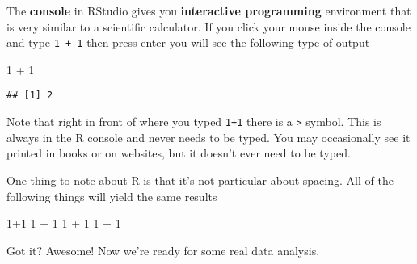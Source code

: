 \documentclass[
]{book}
\newenvironment{Shaded}{\begin{snugshade}}{\end{snugshade}}
\newcommand{\DecValTok}[1]{\textcolor[rgb]{0.00,0.00,0.81}{#1}}
\newcommand{\SpecialCharTok}[1]{\textcolor[rgb]{0.00,0.00,0.00}{#1}}
\begin{document}
The \textbf{console} in RStudio gives you \textbf{interactive programming} environment that is very similar to a scientific calculator. If you click your mouse inside the console and type \texttt{1\ +\ 1} then press enter you will see the following type of output

\begin{Shaded}
\begin{Highlighting}[]
\DecValTok{1} \SpecialCharTok{+} \DecValTok{1}
\end{Highlighting}
\end{Shaded}

\begin{verbatim}
## [1] 2
\end{verbatim}

Note that right in front of where you typed \texttt{1+1} there is a \texttt{\textgreater{}} symbol. This is always in the R console and never needs to be typed. You may occasionally see it printed in books or on websites, but it doesn't ever need to be typed.

One thing to note about R is that it's not particular about spacing. All of the following things will yield the same results

\begin{Shaded}
\begin{Highlighting}[]
\DecValTok{1}\SpecialCharTok{+}\DecValTok{1}
\DecValTok{1} \SpecialCharTok{+} \DecValTok{1}
\DecValTok{1}          \SpecialCharTok{+}        \DecValTok{1}
\DecValTok{1} \SpecialCharTok{+}                                   \DecValTok{1}
\end{Highlighting}
\end{Shaded}

Got it? Awesome! Now we're ready for some real data analysis.

  
\end{document}
